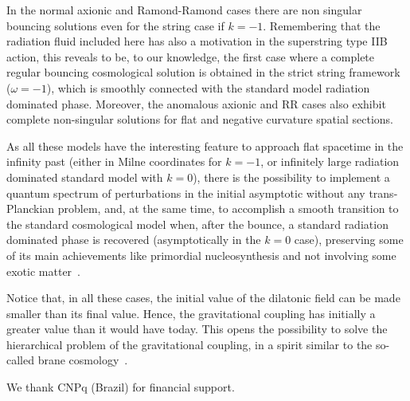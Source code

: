 \documentclass[a4paper,aps,twocolumn,prd,showpacs,nofootinbib]{revtex4}
\begin{document}
In the normal axionic and Ramond-Ramond cases there are non singular
bouncing solutions even for the string case if $k = - 1$. Remembering
that the radiation fluid included here has also a motivation in the
superstring type IIB action, this reveals to be, to our knowledge, the
first case where a complete regular bouncing cosmological solution is
obtained in the strict string framework ($\omega = -1$), which is
smoothly connected with the standard model radiation dominated
phase. Moreover, the anomalous axionic and RR cases also exhibit
complete non-singular solutions for flat and negative curvature
spatial sections.

As all these models have the interesting feature to approach flat
spacetime in the infinity past (either in Milne coordinates for
$k=-1$, or infinitely large radiation dominated standard model with
$k=0$), there is the possibility to implement a quantum spectrum of
perturbations in the initial asymptotic without any trans-Planckian
problem, and, at the same time, to accomplish a smooth transition to
the standard cosmological model when, after the bounce, a standard
radiation dominated phase is recovered (asymptotically in the $k=0$
case), preserving some of its main achievements like primordial
nucleosynthesis and not involving some exotic matter~\cite{ppnpn2}.

Notice that, in all these cases, the initial value of the dilatonic
field can be made smaller than its final value. Hence, the
gravitational coupling has initially a greater value than it would
have today. This opens the possibility to solve the hierarchical
problem of the gravitational coupling, in a spirit similar to the
so-called brane cosmology~\cite{langlois}.

\acknowledgments We thank CNPq (Brazil) for financial support.
\end{document}
